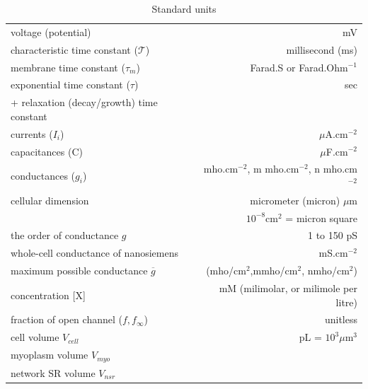 \begin{table}[hbt]
  \begin{center}
    \caption{Standard units}
    \begin{tabular}{lr}
      \hline
      voltage (potential) & mV \\
      characteristic time constant ($\mathcal{T}$) & millisecond (ms) \\
      membrane time constant ($\tau_m$) & Farad.S or Farad.Ohm$^{-1}$ \\
      exponential time constant  ($\tau$) & sec \\
      + relaxation (decay/growth) time constant & \\
      currents ($I_i$) & $\mu$A.cm$^{-2}$ \\
      capacitances (C) & $\mu$F.cm$^{-2}$ \\
      conductances ($g_i$) & mho.cm$^{-2}$, m mho.cm$^{-2}$, n mho.cm$^{-2}$ \\
      cellular dimension & micrometer (micron) $\mu$m \\
      & $10^{-8}$cm$^2$ =  micron square\\
      the order of conductance $g$  & 1 to 150 pS \\
      whole-cell conductance of nanosiemens & mS.cm$^{-2}$ \\
      maximum possible conductance $\overline{g}$ & (mho/cm$^2$,mmho/cm$^2$,
      nmho/cm$^2$) \\
      concentration [X] & mM (milimolar, or milimole per litre)\\
      fraction of open channel ($f,f_\infty$) & unitless\\
      cell volume $V_{cell}$ & pL = $10^3\mu$m$^3$\\
      myoplasm volume $V_{myo}$ & \\
      network SR volume $V_{nsr}$ & \\
      
    \end{tabular}
  \end{center}
  \label{tab:terminology_2}
\end{table}

